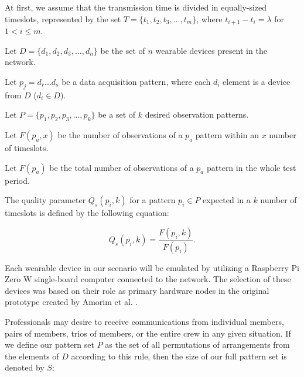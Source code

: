 At first, we assume that the transmission time is divided in equally-sized timeslots, represented by the set $T = \{t_1, t_2, t_3, ..., t_m\}$, where $t_{i+1} - t_i = \lambda$ for $1 < i \leq m$.

\begin{definition}
    Let $D = \{d_1, d_2, d_3, ..., d_n\}$ be the set of $n$ wearable devices present in the network.
\end{definition}

\begin{definition}
    Let $p_j = d_r...d_s$ be a data acquisition pattern, where each $d_i$ element is a device from $D$ ($d_i \in D$). 
\end{definition}

\begin{definition}
    Let $P = \{p_1, p_2, p_3, ..., p_k\}$ be a set of $k$ desired observation patterns.
\end{definition}

\begin{definition}
    Let $F(p_a, x)$ be the number of observations of a $p_a$ pattern within an $x$ number of timeslots.
\end{definition}

\begin{definition}
    Let $F(p_a)$ be the total number of observations of a $p_a$ pattern in the whole test period.
\end{definition}

The quality parameter $Q_s(p_i, k)$ for a pattern $p_i \in P$ expected in a $k$ number of timeslots is defined by the following equation:

\begin{equation}
\label{eq:qos}
    Q_s(p_i, k) = \frac{F(p_i, k)}{F(p_i)}.
\end{equation}

Each wearable device in our scenario will be emulated by utilizing a Raspberry Pi Zero W single-board computer connected to the network. The selection of these devices was based on their role as primary hardware nodes in the original prototype created by Amorim et al. \cite{jp2019software}.

Professionals may desire to receive communications from individual members, pairs of members, trios of members, or the entire crew in any given situation. If we define our pattern set $P$ as the set of all permutations of arrangements from the elements of $D$ according to this rule, then the size of our full pattern set is denoted by $S$:


